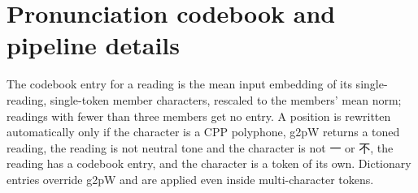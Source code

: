 \documentclass[11pt]{article}
\newcommand{\zh}[1]{#1}
\newcommand{\zh}[1]{\begin{CJK*}{UTF8}{gbsn}#1\end{CJK*}}
\begin{document}
\section{Pronunciation codebook and pipeline details}
\label{app:pipeline}
The codebook entry for a reading is the mean input embedding of its single-reading, single-token member characters, rescaled to the members' mean norm; readings with fewer than three members get no entry. A position is rewritten automatically only if the character is a CPP polyphone, g2pW returns a toned reading, the reading is not neutral tone and the character is not \zh{一} or \zh{不}, the reading has a codebook entry, and the character is a token of its own. Dictionary entries override g2pW and are applied even inside multi-character tokens.
\end{document}
